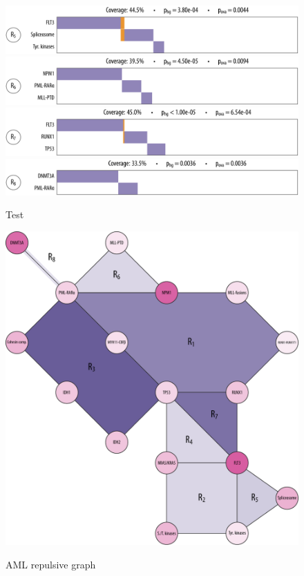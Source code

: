 \begin{figure}[htb]
\centering
\includegraphics[width=\textwidth]{figures/genes/aml_5.pdf}\\[2em]
\includegraphics[width=\textwidth]{figures/genes/aml_6.pdf}\\[2em]
\includegraphics[width=\textwidth]{figures/genes/aml_7.pdf}\\[2em]
\includegraphics[width=\textwidth]{figures/genes/aml_8.pdf}\\[2em]
\caption{Test}
\end{figure}

\begin{figure}[htb]
\includegraphics[width=\textwidth]{figures/genes/graph_aml.pdf}\\[2em]
\caption{AML repulsive graph}
\end{figure}

